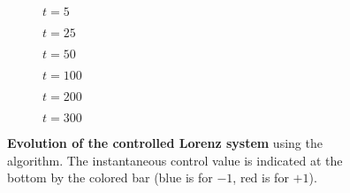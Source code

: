 \begin{figure}
\centering

\begin{subfigure}[t]{.3\textwidth}
	\centering
    	\caption{$t=5$}
	\label{fig:lorenz_field_0}
\end{subfigure} \quad
\begin{subfigure}[t]{.3\textwidth}
	\centering
    	\caption{$t=25$}
	\label{fig:lorenz_field_2}
\end{subfigure} \quad
\begin{subfigure}[t]{.3\textwidth}
	\centering
    	\caption{$t=50$}
	\label{fig:lorenz_field_4}
\end{subfigure}

\medskip

\begin{subfigure}[t]{.3\textwidth}
	\centering
    	\caption{$t=100$}
	\label{fig:lorenz_field_8}
\end{subfigure} \quad
\begin{subfigure}[t]{.3\textwidth}
	\centering
    	\caption{$t=200$}
	\label{fig:lorenz_field_10}
\end{subfigure} \quad
\begin{subfigure}[t]{.3\textwidth}
	\centering
    	\caption{$t=300$}
	\label{fig:lorenz_field_12}
\end{subfigure}

\caption{\textbf{Evolution of the controlled Lorenz system} using the \ppo algorithm. The instantaneous control value is indicated at the bottom by the colored bar (blue is for $-1$, red is for $+1$).}
\label{fig:lorenz_fields}
\end{figure} 
